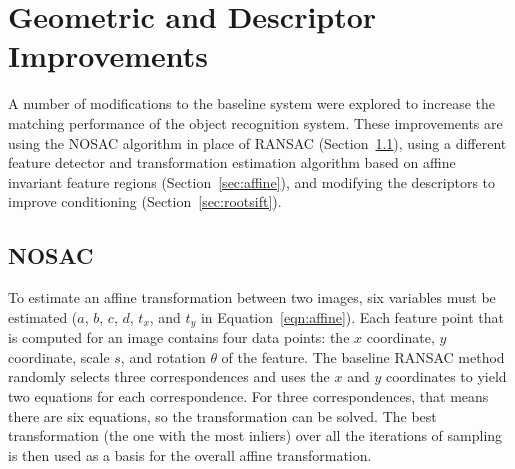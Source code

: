 \documentclass[11pt, onecolumn, a4paper, final]{report} %
\begin{document}
\chapter{Geometric and Descriptor Improvements}
\label{chpt:geoimprovements}

A number of modifications to the baseline system were explored to increase the matching performance of the object recognition system. These improvements are using the NOSAC algorithm in place of RANSAC (Section~\ref{sec:nosac}), using a different feature detector and transformation estimation algorithm based on affine invariant feature regions (Section~\ref{sec:affine}), and modifying the descriptors to improve conditioning (Section~\ref{sec:rootsift}).

\section{NOSAC}
\label{sec:nosac}
To estimate an affine transformation between two images, six variables must be estimated ($a$, $b$, $c$, $d$, $t_x$, and $t_y$ in Equation~\ref{eqn:affine}). 
Each feature point that is computed for an image contains four data points: the $x$ coordinate, $y$ coordinate, scale $s$, and rotation $\theta$ of the feature. The baseline RANSAC method randomly selects three correspondences and uses the $x$ and $y$ coordinates to yield two equations for each correspondence. For three correspondences, that means there are six equations, so the transformation can be solved. The best transformation (the one with the most inliers) over all the iterations of sampling is then used as a basis for the overall affine transformation.
\end{document}
